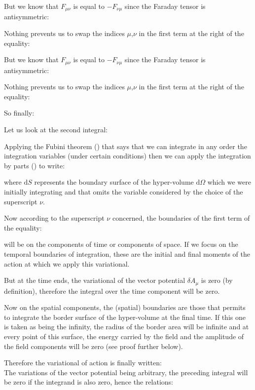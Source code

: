 	But we know that $F_{\mu\nu}$ is equal to $-F_{\nu\mu}$ since the Faraday tensor is antisymmetric:
	
	Nothing prevents us to swap the indices $\mu$,$\nu$ in the first term at the right of the equality:
	
	But we know that $F_{\mu\nu}$ is equal to $-F_{\nu\mu}$ since the Faraday tensor is antisymmetric:
	
	Nothing prevents us to swap the indices $\mu$,$\nu$ in the first term at the right of the equality:
	
	So finally:
	
	Let us look at the second integral:
	
	Applying the Fubini theorem () that says that we can integrate in any order the integration variables (under certain conditions) then we can apply the integration by parts () to write:
	
	where $\mathrm{d}S$ represents the boundary surface of the hyper-volume $\mathrm{d}\Omega$ which we were initially integrating and that omits the variable considered by the choice of the superscript $\nu$.

	Now according to the superscript $\nu$ concerned, the boundaries of the first term of the equality:
	
	will be on the components of time or components of space. If we focus on the temporal boundaries of integration, these are the initial and final moments of the action at which we apply this variational.
	
	But at the time ends, the variational of the vector potential $\delta A_\mu$ is zero (by definition), therefore the integral over the time component will be zero.

	Now on the spatial components, the (spatial) boundaries are those that permits to integrate the border surface of the hyper-volume at the final time. If this one is taken as being the infinity, the radius of the border area will be infinite and at every point of this surface, the energy carried by the field and the amplitude of the field components will be zero (see proof further below).

	Therefore the variational of action is finally written:
	\\
	The variations of the vector potential being arbitrary, the preceding integral will be zero if the integrand is also zero, hence the relations:
	
